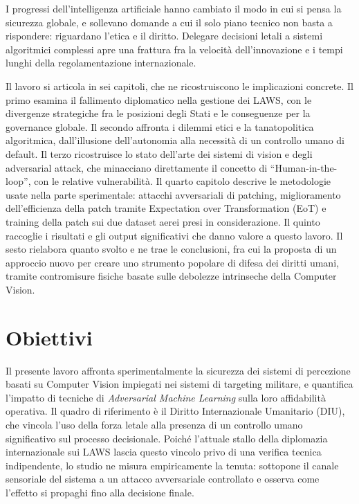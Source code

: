 \documentclass[a4paper,12pt]{report}
\begin{document}
 
I progressi dell'intelligenza artificiale hanno cambiato il modo in cui si pensa la sicurezza globale, e sollevano domande a cui il solo piano tecnico non basta a rispondere: riguardano l'etica e il diritto. Delegare decisioni letali a sistemi algoritmici complessi apre una frattura fra la velocità dell'innovazione e i tempi lunghi della regolamentazione internazionale.
 
Il lavoro si articola in sei capitoli, che ne ricostruiscono le implicazioni concrete. Il primo esamina il fallimento diplomatico nella gestione dei LAWS, con le divergenze strategiche fra le posizioni degli Stati e le conseguenze per la governance globale. Il secondo affronta i dilemmi etici e la tanatopolitica algoritmica, dall'illusione dell'autonomia alla necessità di un controllo umano di default. Il terzo ricostruisce lo stato dell'arte dei sistemi di vision e degli adversarial attack, che minacciano direttamente il concetto di ``Human-in-the-loop'', con le relative vulnerabilità. Il quarto capitolo descrive le metodologie usate nella parte sperimentale: attacchi avversariali di patching, miglioramento dell'efficienza della patch tramite Expectation over Transformation (EoT) e training della patch sui due dataset aerei presi in considerazione. Il quinto raccoglie i risultati e gli output significativi che danno valore a questo lavoro. Il sesto rielabora quanto svolto e ne trae le conclusioni, fra cui la proposta di un approccio nuovo per creare uno strumento popolare di difesa dei diritti umani, tramite contromisure fisiche basate sulle debolezze intrinseche della Computer Vision.
 
\section{Obiettivi}
Il presente lavoro affronta sperimentalmente la sicurezza dei sistemi di percezione basati su Computer Vision impiegati nei sistemi di targeting militare, e quantifica l'impatto di tecniche di \textit{Adversarial Machine Learning} sulla loro affidabilità operativa. Il quadro di riferimento è il Diritto Internazionale Umanitario (DIU), che vincola l'uso della forza letale alla presenza di un controllo umano significativo sul processo decisionale. Poiché l'attuale stallo della diplomazia internazionale sui LAWS lascia questo vincolo privo di una verifica tecnica indipendente, lo studio ne misura empiricamente la tenuta: sottopone il canale sensoriale del sistema a un attacco avversariale controllato e osserva come l'effetto si propaghi fino alla decisione finale.
 
\end{document}
